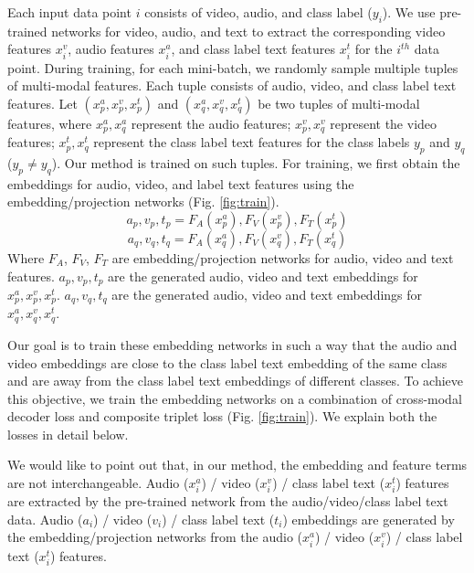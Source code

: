 \documentclass[10pt,twocolumn,letterpaper]{article}
\begin{document}
Each input data point $i$ consists of video, audio, and class label ($y_i$). We use pre-trained networks for video, audio, and text to extract the corresponding video features $x_i^v$, audio features $x_i^a$, and class label text features $x_i^t$ for the $i^{th}$ data point. During training, for each mini-batch, we randomly sample multiple tuples of multi-modal features. Each tuple consists of audio, video, and class label text features. Let $(x^a_p, x^v_p, x^t_p)$ and $(x^a_q, x^v_q, x^t_q)$ be two tuples of multi-modal features, where $x^a_p,x^a_q$ represent the audio features; $x^v_p,x^v_q$ represent the video features; $x^t_p,x^t_q$ represent the class label text features for the class labels $y_p$ and $y_q$ ($y_p\neq y_q$). Our method is trained on such tuples. For training, we first obtain the embeddings for audio, video, and label text features using the embedding/projection networks (Fig. \ref{fig:train}).
\begin{equation}\label{eq:ext1}
    a_p,v_p,t_p = F_A(x^a_p),F_V(x^v_p),F_T(x^t_p)
\end{equation}
\begin{equation}\label{eq:ext2}
    a_q,v_q,t_q = F_A(x^a_q),F_V(x^v_q),F_T(x^t_q)
\end{equation}
Where $F_A$, $F_V$, $F_T$ are embedding/projection networks for audio, video and text features. $a_p, v_p, t_p$ are the generated audio, video and text embeddings for $x^a_p, x^v_p, x^t_p$. $a_q, v_q, t_q$ are the generated audio, video and text embeddings for $x^a_q, x^v_q, x^t_q$.

Our goal is to train these embedding networks in such a way that the audio and video embeddings are close to the class label text embedding of the same class and are away from the class label text embeddings of different classes. To achieve this objective, we train the embedding networks on a combination of cross-modal decoder loss and composite triplet loss (Fig. \ref{fig:train}). We explain both the losses in detail below.

We would like to point out that, in our method, the embedding and feature terms are not interchangeable. Audio ($x_i^a$) / video ($x_i^v$) / class label text ($x_i^t$) features are extracted by the pre-trained network from the audio/video/class label text data. Audio ($a_i$) / video ($v_i$) / class label text ($t_i$) embeddings are generated by the embedding/projection networks from the audio ($x_i^a$) / video ($x_i^v$) / class label text ($x_i^t$) features.
\end{document}
